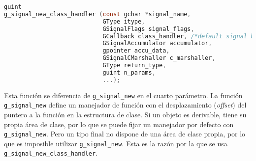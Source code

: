 \begin{lstlisting}[language=C, numbers=none]
guint
g_signal_new_class_handler (const gchar *signal_name,
                            GType itype,
                            GSignalFlags signal_flags,
                            GCallback class_handler, /*default signal handler */
                            GSignalAccumulator accumulator,
                            gpointer accu_data,
                            GSignalCMarshaller c_marshaller,
                            GType return_type,
                            guint n_params,
                            ...);
\end{lstlisting}

Esta función se diferencia de \texttt{g\_signal\_new} en el cuarto parámetro.
La función \texttt{g\_signal\_new} define un manejador de función con el desplazamiento (\emph{offset}) del
puntero a la función en la estructura de clase. Si un objeto es derivable, tiene su propia área de clase, por
lo que se puede fijar un manejador por defecto con \texttt{g\_signal\_new}. Pero un tipo final no dispone de
una área de clase propia, por lo que es imposible utilizar \texttt{g\_signal\_new}. Esta es la razón por la que
se usa \texttt{g\_signal\_new\_class\_handler}.


                          
                            

  


